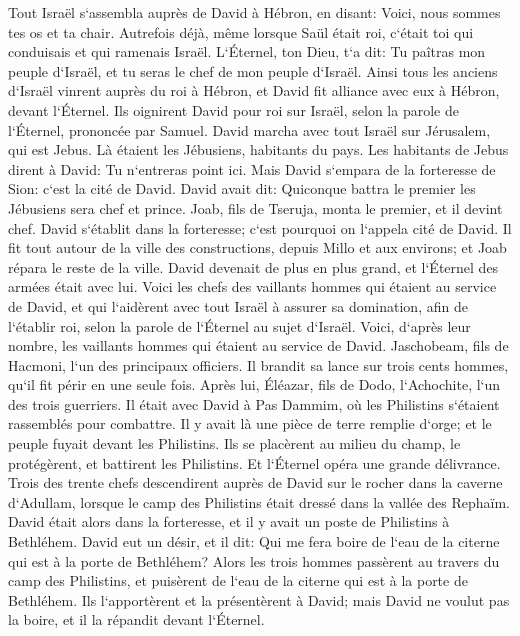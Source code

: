 \verse Tout Israël s`assembla auprès de David à Hébron, en disant: Voici, nous sommes tes os et ta chair. 
\verse Autrefois déjà, même lorsque Saül était roi, c`était toi qui conduisais et qui ramenais Israël. L`Éternel, ton Dieu, t`a dit: Tu paîtras mon peuple d`Israël, et tu seras le chef de mon peuple d`Israël. 
\verse Ainsi tous les anciens d`Israël vinrent auprès du roi à Hébron, et David fit alliance avec eux à Hébron, devant l`Éternel. Ils oignirent David pour roi sur Israël, selon la parole de l`Éternel, prononcée par Samuel. 
\verse David marcha avec tout Israël sur Jérusalem, qui est Jebus. Là étaient les Jébusiens, habitants du pays. 
\verse Les habitants de Jebus dirent à David: Tu n`entreras point ici. Mais David s`empara de la forteresse de Sion: c`est la cité de David. 
\verse David avait dit: Quiconque battra le premier les Jébusiens sera chef et prince. Joab, fils de Tseruja, monta le premier, et il devint chef. 
\verse David s`établit dans la forteresse; c`est pourquoi on l`appela cité de David. 
\verse Il fit tout autour de la ville des constructions, depuis Millo et aux environs; et Joab répara le reste de la ville. 
\verse David devenait de plus en plus grand, et l`Éternel des armées était avec lui. 
\verse Voici les chefs des vaillants hommes qui étaient au service de David, et qui l`aidèrent avec tout Israël à assurer sa domination, afin de l`établir roi, selon la parole de l`Éternel au sujet d`Israël. 
\verse Voici, d`après leur nombre, les vaillants hommes qui étaient au service de David. Jaschobeam, fils de Hacmoni, l`un des principaux officiers. Il brandit sa lance sur trois cents hommes, qu`il fit périr en une seule fois. 
\verse Après lui, Éléazar, fils de Dodo, l`Achochite, l`un des trois guerriers. 
\verse Il était avec David à Pas Dammim, où les Philistins s`étaient rassemblés pour combattre. Il y avait là une pièce de terre remplie d`orge; et le peuple fuyait devant les Philistins. 
\verse Ils se placèrent au milieu du champ, le protégèrent, et battirent les Philistins. Et l`Éternel opéra une grande délivrance. 
\verse Trois des trente chefs descendirent auprès de David sur le rocher dans la caverne d`Adullam, lorsque le camp des Philistins était dressé dans la vallée des Rephaïm. 
\verse David était alors dans la forteresse, et il y avait un poste de Philistins à Bethléhem. 
\verse David eut un désir, et il dit: Qui me fera boire de l`eau de la citerne qui est à la porte de Bethléhem? 
\verse Alors les trois hommes passèrent au travers du camp des Philistins, et puisèrent de l`eau de la citerne qui est à la porte de Bethléhem. Ils l`apportèrent et la présentèrent à David; mais David ne voulut pas la boire, et il la répandit devant l`Éternel. 

